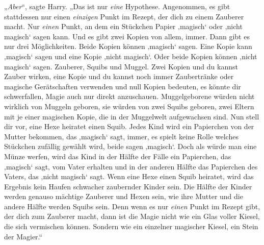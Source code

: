 „\emph{Aber}“, sagte Harry. „Das ist nur \emph{eine} Hypothese. Angenommen, es gibt stattdessen nur einen \emph{einzigen} Punkt im Rezept, der dich zu einem Zauberer macht. Nur \emph{einen} Punkt, an dem ein Stückchen Papier ‚magisch‘ oder ‚nicht magisch‘ sagen kann. Und es gibt zwei Kopien von allem, immer. Dann gibt es nur drei Möglichkeiten. Beide Kopien können ‚magisch‘ sagen. Eine Kopie kann ‚magisch‘ sagen und eine Kopie ‚nicht magisch‘. Oder beide Kopien können ‚nicht magisch‘ sagen. Zauberer, Squibs und Muggel. Zwei Kopien und du kannst Zauber wirken, eine Kopie und du kannst noch immer Zaubertränke oder magische Gerätschaften verwenden und null Kopien bedeuten, es könnte dir schwerfallen, Magie auch nur direkt anzuschauen. Muggelgeborene würden nicht wirklich von Muggeln geboren, sie würden von zwei Squibs geboren, zwei Eltern mit je einer magischen Kopie, die in der Muggelwelt aufgewachsen sind. Nun stell dir vor, eine Hexe heiratet einen Squib. Jedes Kind wird ein Papierchen von der Mutter bekommen, das ‚magisch‘ sagt, immer, es spielt keine Rolle welches Stückchen zufällig gewählt wird, beide sagen ‚magisch‘. Doch als würde man eine Münze werfen, wird das Kind in der Hälfte der Fälle ein Papierchen, das ‚magisch‘ sagt, vom Vater erhalten und in der anderen Hälfte das Papierchen des Vaters, das ‚nicht magisch‘ sagt. Wenn eine Hexe einen Squib heiratet, wird das Ergebnis kein Haufen schwacher zaubernder Kinder sein. Die Hälfte der Kinder werden genauso mächtige Zauberer und Hexen sein, wie ihre Mutter und die andere Hälfte werden Squibs sein. Denn wenn es nur \emph{einen} Punkt im Rezept gibt, der dich zum Zauberer macht, dann ist die Magie nicht wie ein Glas voller Kiesel, die sich vermischen können. Sondern wie ein einzelner magischer Kiesel, ein Stein der Magier.“%

